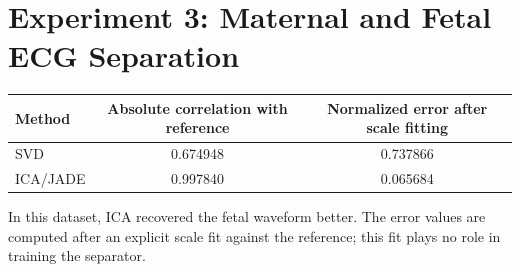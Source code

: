 \section*{Experiment 3: Maternal and Fetal ECG Separation}

\begin{keyresult}[title={Main result for this dataset}]
\centering
\begin{tabular}{@{}lcc@{}}
\toprule
\textbf{Method} & \textbf{Absolute correlation with reference} & \textbf{Normalized error after scale fitting}\\
\midrule
SVD      & 0.674948 & 0.737866\\
ICA/JADE & 0.997840 & 0.065684\\
\bottomrule
\end{tabular}

\vspace{0.6em}
\raggedright
In this dataset, ICA recovered the fetal waveform better. The error values are computed after an explicit scale fit against the reference; this fit plays no role in training the separator.
\end{keyresult}
